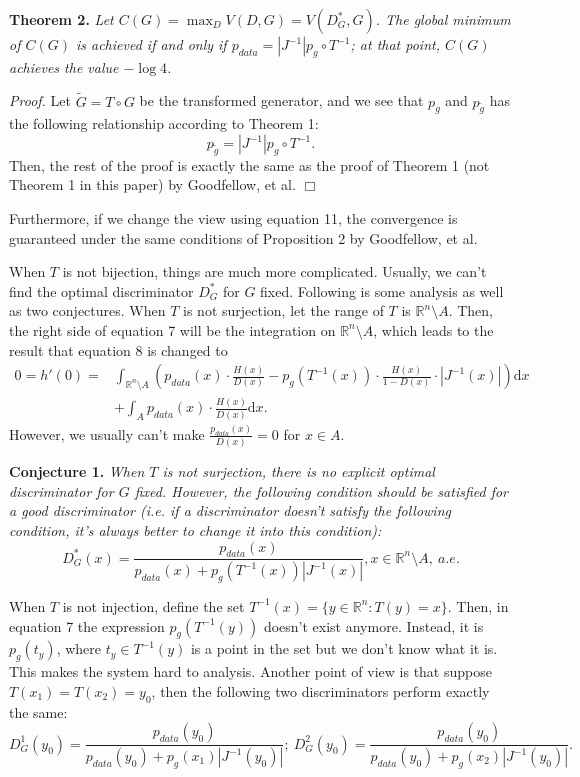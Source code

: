 \documentclass{article}
\begin{document}
\textbf{Theorem 2.} \textit{Let $C(G)=\max_{D}V(D,G)=V(D_G^*,G)$. The global minimum of $C(G)$ is achieved if and only if $p_{data}=|J^{-1}|p_g\circ T^{-1}$; at that point, $C(G)$ achieves the value $-\log 4$.}

\textit{Proof. } Let $\widetilde{G}=T\circ G$ be the transformed generator, and we see that $p_g$ and $p_{\tilde{g}}$ has the following relationship according to Theorem 1:
\begin{equation}p_{\tilde{g}}=|J^{-1}|p_g\circ T^{-1}.\end{equation}
Then, the rest of the proof is exactly the same as the proof of Theorem 1 (not Theorem 1 in this paper) by Goodfellow, et al. \cite{GAN} $\Box$

Furthermore, if we change the view using equation 11, the convergence is guaranteed under the same conditions of Proposition 2 by Goodfellow, et al\cite{GAN}.

When $T$ is not bijection, things are much more complicated. Usually, we can't find the optimal discriminator $D_G^*$ for $G$ fixed. Following is some analysis as well as two conjectures.
When $T$ is not surjection, let the range of $T$ is $\mathbb{R}^n\setminus A$. Then, the right side of equation 7 will be the integration on $\mathbb{R}^n\setminus A$, which leads to the result that equation 8 is changed to
\begin{equation}\begin{array}{ll}
0=h'(0)=&\int_{\mathbb{R}^n\setminus A}\left(p_{data}(x)\cdot\frac{H(x)}{D(x)}-p_g(T^{-1}(x))\cdot\frac{H(x)}{1-D(x)}\cdot|J^{-1}(x)|\right)\mathrm{d} x\\&+\int_{A}p_{data}(x)\cdot\frac{H(x)}{D(x)}\mathrm{d} x.\end{array}
\end{equation}
However, we usually can't make $\frac{p_{data}(x)}{D(x)}=0$ for $x\in A$.

\textbf{Conjecture 1. } \emph{When $T$ is not surjection, there is no explicit optimal discriminator for $G$ fixed. However, the following condition should be satisfied for a good discriminator (i.e. if a discriminator doesn't satisfy the following condition, it's always better to change it into this condition):}
\begin{equation}D_G^*(x)=\frac{p_{data}(x)}{p_{data}(x)+p_g(T^{-1}(x))|J^{-1}(x)|},x\in \mathbb{R}^n\setminus A,\ a.e.\end{equation}

When $T$ is not injection, define the set $T^{-1}(x)=\{y\in\mathbb{R}^n:T(y)=x\}$. Then, in equation 7 the expression $p_g(T^{-1}(y))$ doesn't exist anymore. Instead, it is $p_g(t_y)$, where $t_y\in T^{-1}(y)$ is a point in the set but we don't know what it is. This makes the system hard to analysis. Another point of view is that suppose $T(x_1)=T(x_2)=y_0$, then
the following two discriminators perform exactly the same:
\begin{equation}
D_G^1(y_0)=\frac{p_{data}(y_0)}{p_{data}(y_0)+p_g(x_1)|J^{-1}(y_0)|};\
D_G^2(y_0)=\frac{p_{data}(y_0)}{p_{data}(y_0)+p_g(x_2)|J^{-1}(y_0)|}.
\end{equation}
\end{document}
